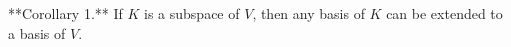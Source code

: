 **Corollary 1.** If $K$ is a subspace of $V$, then any basis of $K$ can be extended to a basis of $V$.
